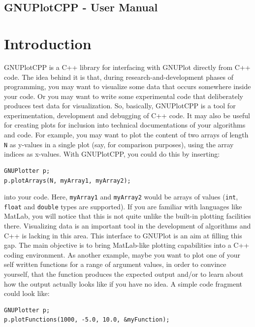 \documentclass[11pt]{article}
\begin{document}
\parindent=0in
\parskip=0pt

 \setcounter{page}{1}

\begin{center}
\section{GNUPlotCPP - User Manual}
\end{center}

\section{Introduction}
GNUPlotCPP is a C++ library for interfacing with GNUPlot directly from C++ code. The idea behind it is that, during research-and-development phases of programming, you may want to visualize some data that occurs somewhere inside your code. Or you may want to write some experimental code that deliberately produces test data for visualization. So, basically, GNUPlotCPP is a tool for experimentation, development and debugging of C++ code. It may also be useful for creating plots for inclusion into technical documentations of your algorithms and code. For example, you may want to plot the content of two arrays of length \texttt{N} as y-values in a single plot (say, for comparison purposes), using the array indices as x-values. With GNUPlotCPP, you could do this by inserting:
\begin{verbatim}
GNUPlotter p;
p.plotArrays(N, myArray1, myArray2);
\end{verbatim}
into your code. Here, \texttt{myArray1} and \texttt{myArray2} would be arrays of values (\texttt{int}, \texttt{float} and \texttt{double} types are supported). If you are familiar with languages like MatLab, you will notice that this is not quite unlike the built-in plotting facilities there. Visualizing data is an important tool in the development of algorithms and C++ is lacking in this area. This interface to GNUPlot is an aim at filling this gap. The main objective is to bring MatLab-like plotting capabilities into a C++ coding environment. As another example, maybe you want to plot one of your self written functions for a range of argument values, in order to convince yourself, that the function produces the expected output and/or to learn about how the output actually looks like if you have no idea. A simple code fragment could look like:
\begin{verbatim}
GNUPlotter p;
p.plotFunctions(1000, -5.0, 10.0, &myFunction);
\end{verbatim}
\end{document}
